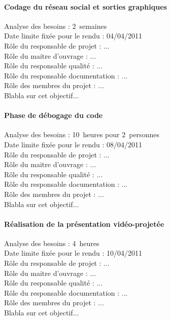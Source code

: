 \paragraph*{Codage du réseau social et sorties graphiques\\}
Analyse des besoins : 2~semaines\\
Date limite fixée pour le rendu : 04/04/2011\\
Rôle du responsable de projet : ...\\
Rôle du maitre d'ouvrage : ...\\
Rôle du responsable qualité : ...\\
Rôle du responsable documentation : ...\\
Rôle des membres du projet : ...\\
Blabla sur cet objectif...

\paragraph*{Phase de débogage du code\\}
Analyse des besoins : 10~heures pour 2~personnes\\
Date limite fixée pour le rendu : 08/04/2011\\
Rôle du responsable de projet : ...\\
Rôle du maitre d'ouvrage : ...\\
Rôle du responsable qualité : ...\\
Rôle du responsable documentation : ...\\
Rôle des membres du projet : ...\\
Blabla sur cet objectif...

\paragraph*{Réalisation de la présentation vidéo-projetée\\}
Analyse des besoins : 4~heures\\
Date limite fixée pour le rendu : 10/04/2011\\
Rôle du responsable de projet : ...\\
Rôle du maitre d'ouvrage : ...\\
Rôle du responsable qualité : ...\\
Rôle du responsable documentation : ...\\
Rôle des membres du projet : ...\\
Blabla sur cet objectif...

